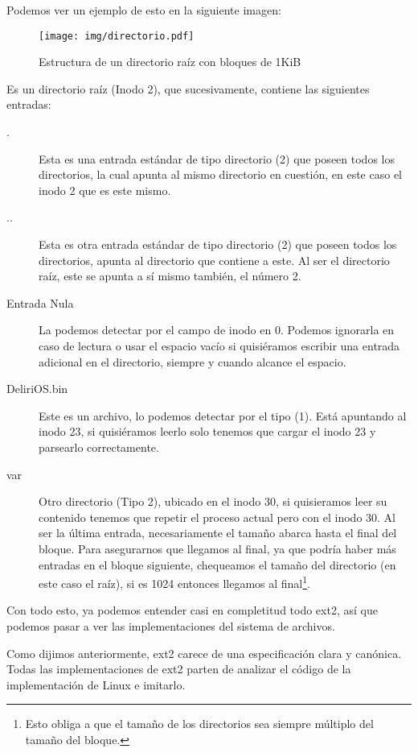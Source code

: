 Podemos ver un ejemplo de esto en la siguiente imagen:

\begin{figure}
  \centering
  \texttt{[image: img/directorio.pdf]}
  \caption{Estructura de un directorio raíz con bloques de 1KiB}
\end{figure}

Es un directorio raíz (Inodo 2), que sucesivamente, contiene las siguientes entradas:

\begin{description}
\item[.] Esta es una entrada estándar de tipo directorio (2) que poseen todos los directorios, la cual apunta al mismo directorio en cuestión, en este caso el inodo 2 que es este mismo.
\item[..] Esta es otra entrada estándar de tipo directorio (2) que poseen todos los directorios, apunta al directorio que contiene a este. Al ser el directorio raíz, este se apunta a sí mismo también, el número 2.
\item[Entrada Nula] La podemos detectar por el campo de inodo en 0. Podemos ignorarla en caso de lectura o usar el espacio vacío si quisiéramos escribir una entrada adicional en el directorio, siempre y cuando alcance el espacio.
\item[DeliriOS.bin] Este es un archivo, lo podemos detectar por el tipo (1). Está apuntando al inodo 23, si quisiéramos leerlo solo tenemos que cargar el inodo 23 y parsearlo correctamente. 
\item[var] Otro directorio (Tipo 2), ubicado en el inodo 30, si quisieramos leer su contenido tenemos que repetir el proceso actual pero con el inodo 30. Al ser la última entrada, necesariamente el tamaño abarca hasta el final del bloque. Para asegurarnos que llegamos al final, ya que podría haber más entradas en el bloque siguiente, chequeamos el tamaño del directorio (en este caso el raíz), si es 1024 entonces llegamos al final\footnote{Esto obliga a que el tamaño de los directorios sea siempre múltiplo del tamaño del bloque.}.
\end{description}


Con todo esto, ya podemos entender casi en completitud todo ext2, así que podemos pasar a ver las implementaciones del sistema de archivos.


Como dijimos anteriormente, ext2 carece de una especificación clara y canónica.
Todas las implementaciones de ext2 parten de analizar el código de la implementación de Linux e imitarlo.

